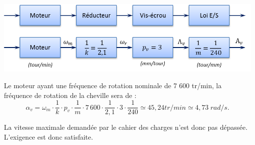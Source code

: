\documentclass[10pt]{article}
\begin{document}
\begin{corrige}
\begin{center}
\includegraphics[width=.8\textwidth]{images/SchemaBloc}
\end{center}

Le moteur ayant une fréquence de rotation nominale de 7 600 tr/min, la fréquence de rotation de la cheville sera de :
$$
\alpha_v = \omega_m \cdot \dfrac{1}{k}\cdot p_v \cdot \dfrac{1}{m} \cdot 
7\,600 \cdot \dfrac{1}{2,1}\cdot 3 \cdot \dfrac{1}{240} \simeq 45,24 tr/min \simeq 
4,73\; rad /s.
$$

La vitesse maximale demandée par le cahier des charges n'est donc pas dépassée. L'exigence est donc satisfaite. 

\end{corrige}
\else
\fi
\end{document}
